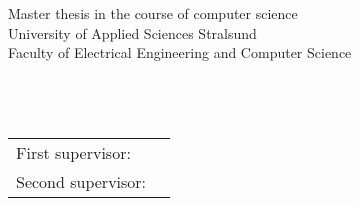 \begin{otherlanguage}{british}
    \begin{center}
        \vspace{-2ex}
        \SingleSpacing
        Master thesis in the course of computer science\\
        University of Applied Sciences Stralsund\\
        Faculty of Electrical Engineering and Computer Science\\
        \ \\
        \theauthor\\
        \ \\
        \textbf{\thetitle}
    \end{center}
    
    
    
    \vfill
    \begin{tabular}{ll}
	    First supervisor: & \theSupervisor \\
		Second supervisor: & \theSecSupervisor\\
    \end{tabular}
\end{otherlanguage}
\cleardoublepage
\blankpage
\cleartoevenpage[\thispagestyle{empty}]
\renewcommand{\contentsname}{Inhaltsverzeichnis}
\tableofcontents*
{}
\cleardoublepage

{}
\listoffigures*
\cleardoublepage

{}
\listoftables*
\cleardoublepage


\cleardoublepage


\cleardoublepage
\savepagenumber

\blankpage